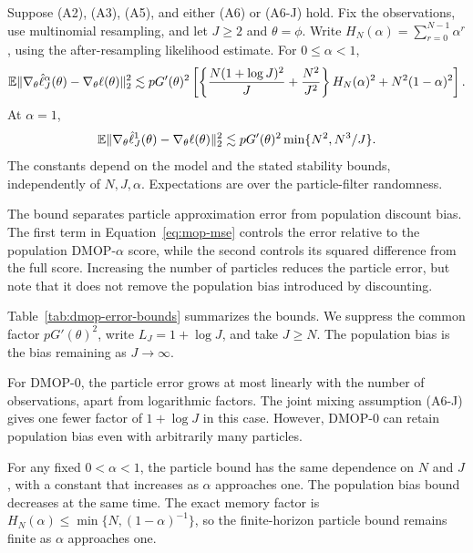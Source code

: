 \documentclass[numsec,webpdf,modern,medium,namedate]{oup-authoring-template}
\begin{document}
\begin{thm}
\label{thm:mop-biasvar}
Suppose (A2), (A3), (A5), and either (A6) or (A6-J) hold.
Fix the observations, use multinomial resampling, and let $J\geq2$ and $\theta=\phi$.
Write $H_N(\alpha)=\sum_{r=0}^{N-1}\alpha^r$,
using the after-resampling likelihood estimate.
For $0\leq\alpha<1$,
\begin{equation}
\label{eq:mop-mse}
\mathbb{E}\|\nabla_\theta\hat\ell_J^\alpha(\theta)-\nabla_\theta\ell(\theta)\|_2^2
\lesssim pG'(\theta)^2
\left[
\left\{\frac{N(1+\log J)^2}{J}+\frac{N^2}{J^2}\right\}
H_N(\alpha)^2+N^2(1-\alpha)^2
\right].
\end{equation}
At $\alpha=1$,
\begin{equation}
\label{eq:mop-one-mse}
\mathbb{E}\|\nabla_\theta\hat\ell_J^1(\theta)-\nabla_\theta\ell(\theta)\|_2^2
\lesssim pG'(\theta)^2\min\{N^2,N^3/J\}.
\end{equation}
The constants depend on the model and the stated stability bounds, independently of $N,J,\alpha$.
Expectations are over the particle-filter randomness.
\end{thm}

The bound separates particle approximation error from population discount bias.
The first term in Equation~\ref{eq:mop-mse} controls the error relative to the population DMOP-$\alpha$ score, while the second controls its squared difference from the full score.
Increasing the number of particles reduces the particle error, but note that it does not remove the population bias introduced by discounting.

Table~\ref{tab:dmop-error-bounds} summarizes the bounds.
We suppress the common factor $pG'(\theta)^2$, write $L_J=1+\log J$, and take $J\geq N$.
The population bias is the bias remaining as $J\to\infty$.



For DMOP-$0$, the particle error grows at most linearly with the number of observations, apart from logarithmic factors.
The joint mixing assumption (A6-J) gives one fewer factor of $1+\log J$ in this case.
However, DMOP-$0$ can retain population bias even with arbitrarily many particles.

For any fixed $0<\alpha<1$, the particle bound has the same dependence on $N$ and $J$, with a constant that increases as $\alpha$ approaches one.
The population bias bound decreases at the same time.
The exact memory factor is $H_N(\alpha)\leq\min\{N,(1-\alpha)^{-1}\}$, so the finite-horizon particle bound remains finite as $\alpha$ approaches one.
\end{document}
